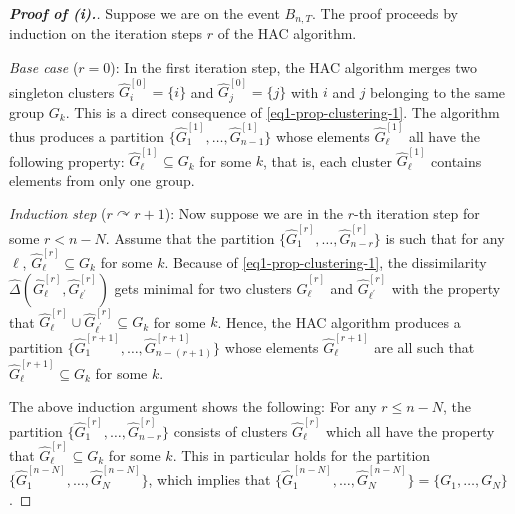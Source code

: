 \begin{proof}[\textnormal{\textbf{Proof of (i).}}]
Suppose we are on the event $B_{n,T}$. The proof proceeds by induction on the iteration steps $r$ of the HAC algorithm. 
\vspace{7pt}

\textit{Base case} ($r=0$): In the first iteration step, the HAC algorithm merges two singleton clusters $\widehat{G}_i^{[0]} = \{ i \}$ and $\widehat{G}_j^{[0]} = \{ j \}$ with $i$ and $j$ belonging to the same group $G_k$. This is a direct consequence of \eqref{eq1-prop-clustering-1}. The algorithm thus produces a partition $\{ \widehat{G}_1^{[1]},\ldots,\widehat{G}_{n-1}^{[1]} \}$ whose elements $\widehat{G}_\ell^{[1]}$ all have the following property: $\widehat{G}_\ell^{[1]} \subseteq G_k$ for some $k$, that is, each cluster $\widehat{G}_\ell^{[1]}$ contains elements from only one group. 
\vspace{7pt}

\textit{Induction step} ($r \curvearrowright r+1$): Now suppose we are in the $r$-th iteration step for some $r < n-N$. Assume that the partition $\{\widehat{G}_1^{[r]},\ldots,\widehat{G}_{n-r}^{[r]}\}$ is such that for any $\ell$, $\widehat{G}_\ell^{[r]} \subseteq G_k$ for some $k$. Because of \eqref{eq1-prop-clustering-1}, the dissimilarity $\widehat{\Delta}(\widehat{G}_\ell^{[r]},\widehat{G}_{\ell^\prime}^{[r]})$ gets minimal for two clusters $\widehat{G}_\ell^{[r]}$ and $\widehat{G}_{\ell^\prime}^{[r]}$ with the property that $\widehat{G}_\ell^{[r]} \cup \widehat{G}_{\ell^\prime}^{[r]} \subseteq G_k$ for some $k$. Hence, the HAC algorithm produces a partition $\{ \widehat{G}_1^{[r+1]},\ldots,\widehat{G}_{n-(r+1)}^{[r+1]} \}$ whose elements $\widehat{G}_\ell^{[r+1]}$ are all such that $\widehat{G}_\ell^{[r+1]} \subseteq G_k$ for some $k$. 
\vspace{7pt}

The above induction argument shows the following: For any $r \le n - N$, the partition $\{ \widehat{G}_1^{[r]},\ldots,\widehat{G}_{n-r}^{[r]} \}$ consists of clusters $\widehat{G}_\ell^{[r]}$ which all have the property that $\widehat{G}_\ell^{[r]} \subseteq G_k$ for some $k$. This in particular holds for the partition $\{ \widehat{G}_1^{[n-N]},\ldots,\widehat{G}_N^{[n-N]} \}$, which implies that $\{ \widehat{G}_1^{[n-N]},\ldots,\widehat{G}_N^{[n-N]} \} =\{ G_1,\ldots,G_N \}$.  
\end{proof}


